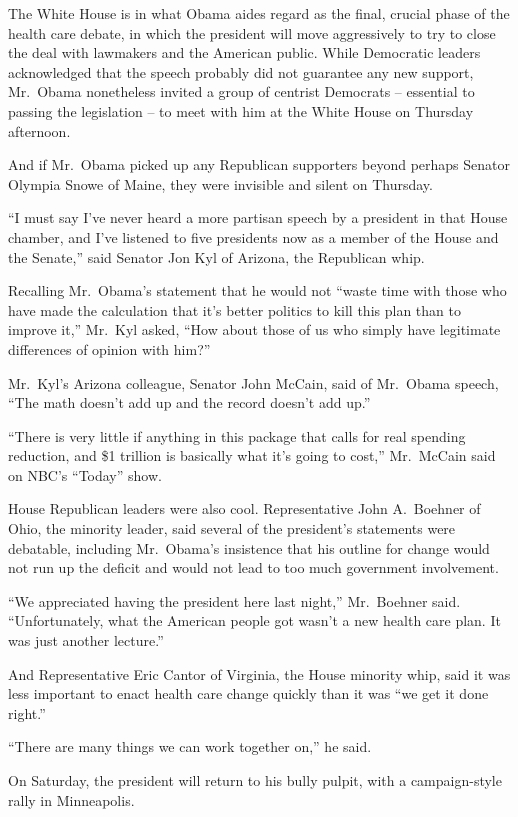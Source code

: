 ﻿\documentclass[12pt]{article}
\begin{document}
The White House is in what Obama aides regard as the final, crucial phase of the health care debate,
in which the president will move aggressively to try to close the deal with lawmakers and the
American public. While Democratic leaders acknowledged that the speech probably did not guarantee
any new support, Mr.~Obama nonetheless invited a group of centrist Democrats -- essential to passing
the legislation -- to meet with him at the White House on Thursday afternoon.

And if Mr.~Obama picked up any Republican supporters beyond perhaps Senator Olympia Snowe of Maine,
they were invisible and silent on Thursday.

``I must say I've never heard a more partisan speech by a president in that House chamber, and I've
listened to five presidents now as a member of the House and the Senate,'' said Senator Jon Kyl of
Arizona, the Republican whip.

Recalling Mr.~Obama's statement that he would not ``waste time with those who have made the
calculation that it's better politics to kill this plan than to improve it,'' Mr.~Kyl asked, ``How
about those of us who simply have legitimate differences of opinion with him?''

Mr.~Kyl's Arizona colleague, Senator John McCain, said of Mr.~Obama speech, ``The math doesn't add
up and the record doesn't add up.''

``There is very little if anything in this package that calls for real spending reduction, and \$1
trillion is basically what it's going to cost,'' Mr.~McCain said on NBC's ``Today'' show.

House Republican leaders were also cool. Representative John A.~Boehner of Ohio, the minority
leader, said several of the president's statements were debatable, including Mr.~Obama's insistence
that his outline for change would not run up the deficit and would not lead to too much government
involvement.

``We appreciated having the president here last night,'' Mr.~Boehner said. ``Unfortunately, what the
American people got wasn't a new health care plan. It was just another lecture.''

And Representative Eric Cantor of Virginia, the House minority whip, said it was less important to
enact health care change quickly than it was ``we get it done right.''

``There are many things we can work together on,'' he said.

On Saturday, the president will return to his bully pulpit, with a campaign-style rally in
Minneapolis.
\end{document}
